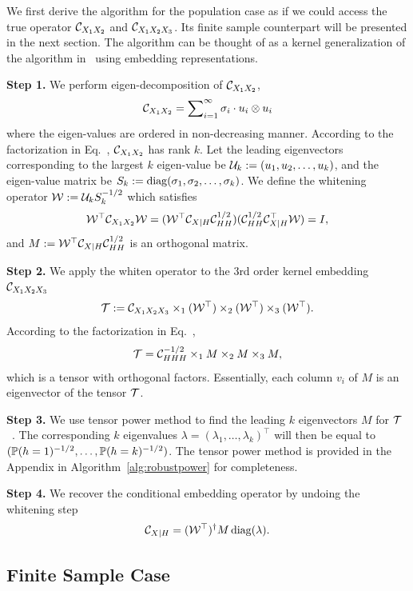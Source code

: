 \documentclass{article}
\begin{document}
We  first derive the algorithm for the population case as if we could access the true operator $\mathcal{C}_{X_1 X_2}$ and $\mathcal{C}_{X_1 X_2 X_3}$. Its finite sample counterpart  will be presented in the next section. The algorithm can be thought of as a kernel generalization of the algorithm in~\citet{AnandkumarEtal:community12} using embedding representations.

{\bf Step 1.} We perform eigen-decomposition of $\mathcal{C}_{X_1 X_2}$,
$$\mathcal{C}_{X_1 X_2} = \sum\nolimits_{i=1}^{\infty} \sigma_i \cdot u_i \otimes u_i$$
where the eigen-values are ordered in non-decreasing manner.
According to the factorization in Eq.~, $\mathcal{C}_{X_1 X_2}$ has rank $k$.
Let the leading eigenvectors corresponding to the largest $k$ eigen-value be  $\mathcal{U}_k:=(u_1,u_2,\ldots,u_k)$, and the eigen-value matrix be $S_k:=\mathop{\mathrm{diag}}(\sigma_1,\sigma_2,\ldots,\sigma_k)$. We define the whitening operator $\mathcal{W}:= \mathcal{U}_k S_k^{-1/2}$ which satisfies
\begin{align*}
  \mathcal{W}^\top \mathcal{C}_{X_1X_2} \mathcal{W} = (\mathcal{W}^\top \mathcal{C}_{X|H} \mathcal{C}_{HH}^{1/2}) (\mathcal{C}_{HH}^{1/2} \mathcal{C}_{X|H}^\top \mathcal{W}) = I,
\end{align*}
and $M:=\mathcal{W}^\top \mathcal{C}_{X|H} \mathcal{C}_{HH}^{1/2}$ is an orthogonal matrix.

{\bf Step 2.} We apply the whiten operator to the 3rd order kernel embedding $\mathcal{C}_{X_1 X_2 X_3}$
$$
  {\mathcal{T}} := \mathcal{C}_{X_1 X_2 X_3} \times_1 (\mathcal{W}^\top) \times_2 (\mathcal{W}^\top) \times_3 (\mathcal{W}^\top).
$$
According to the factorization in Eq.~,
$$
  {\mathcal{T}} = \mathcal{C}_{HHH}^{-1/2} \times_1 M \times_2 M \times_3 M,
$$
which is a tensor with orthogonal factors. Essentially, each column $v_i$ of $M$ is an eigenvector of the tensor ${\mathcal{T}}$.

{\bf Step 3.} We use tensor power method to find the leading $k$ eigenvectors $M$ for ${\mathcal{T}}$~\cite{AnandkumarEtal:tensor12}. The corresponding $k$ eigenvalues $\lambda = (\lambda_1,\ldots,\lambda_k)^\top$ will then be equal to $(\mathbb{P}(h=1)^{-1/2},\ldots,\mathbb{P}(h=k)^{-1/2})$. The tensor power method is provided in the Appendix in Algorithm~\ref{alg:robustpower} for completeness.

{\bf Step 4.} We recover the conditional embedding operator by undoing the whitening step
$$
  \mathcal{C}_{X|H} = (\mathcal{W}^\top)^\dagger M \mathop{\mathrm{diag}}(\lambda).
$$

\vspace{-3mm}
\subsection{Finite Sample Case}\label{sec:sample}
\vspace{-2mm}
\end{document}
